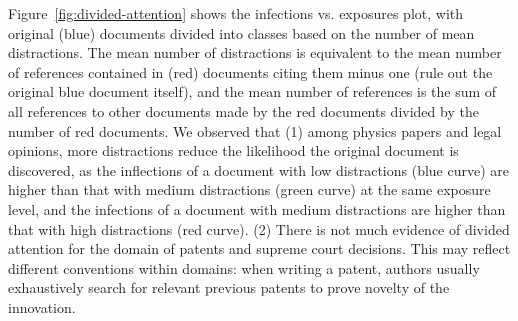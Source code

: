 \documentclass[10pt]{bmc_article}
\newenvironment{bmcformat}{\baselineskip20pt\sloppy\setboolean{publ}{false}}{\baselineskip20pt\sloppy}
\begin{document}
\begin{bmcformat}

Figure~\ref{fig:divided-attention} shows the infections vs. exposures plot, with original (blue) documents divided into classes based on the number of mean distractions. The mean number of  distractions is equivalent to the mean number of references contained in (red) documents citing them minus one (rule out the original blue document itself), and the mean number of references is the sum of all references to other documents made by the red documents divided by the number of red documents. We observed that (1) among physics papers and legal opinions, more distractions reduce the likelihood the original document is discovered, as the inflections of a document with low distractions (blue curve) are higher than that with medium distractions (green curve) at the same exposure level, and the infections of a document with medium distractions are higher than that with high distractions (red curve). (2) There is not much evidence of divided attention for the domain of patents and supreme court decisions. This may reflect different conventions within domains: when writing a patent, authors usually exhaustively search for relevant previous patents to prove novelty of the innovation.


\end{bmcformat}
\end{document}
